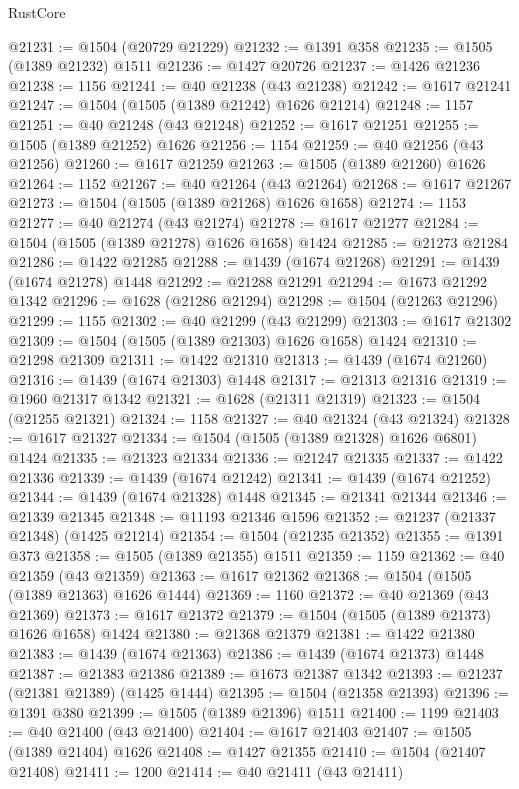 \begin{lexlean}{RustCore}
\begin{coremodule}
@21231 := @1504 (@20729 @21229)
@21232 := @1391 @358
@21235 := @1505 (@1389 @21232) @1511
@21236 := @1427 @20726
@21237 := @1426 @21236
@21238 := 1156
@21241 := @40 @21238 (@43 @21238)
@21242 := @1617 @21241
@21247 := @1504 (@1505 (@1389 @21242) @1626 @21214)
@21248 := 1157
@21251 := @40 @21248 (@43 @21248)
@21252 := @1617 @21251
@21255 := @1505 (@1389 @21252) @1626
@21256 := 1154
@21259 := @40 @21256 (@43 @21256)
@21260 := @1617 @21259
@21263 := @1505 (@1389 @21260) @1626
@21264 := 1152
@21267 := @40 @21264 (@43 @21264)
@21268 := @1617 @21267
@21273 := @1504 (@1505 (@1389 @21268) @1626 @1658)
@21274 := 1153
@21277 := @40 @21274 (@43 @21274)
@21278 := @1617 @21277
@21284 := @1504 (@1505 (@1389 @21278) @1626 @1658) @1424
@21285 := @21273 @21284
@21286 := @1422 @21285
@21288 := @1439 (@1674 @21268)
@21291 := @1439 (@1674 @21278) @1448
@21292 := @21288 @21291
@21294 := @1673 @21292 @1342
@21296 := @1628 (@21286 @21294)
@21298 := @1504 (@21263 @21296)
@21299 := 1155
@21302 := @40 @21299 (@43 @21299)
@21303 := @1617 @21302
@21309 := @1504 (@1505 (@1389 @21303) @1626 @1658) @1424
@21310 := @21298 @21309
@21311 := @1422 @21310
@21313 := @1439 (@1674 @21260)
@21316 := @1439 (@1674 @21303) @1448
@21317 := @21313 @21316
@21319 := @1960 @21317 @1342
@21321 := @1628 (@21311 @21319)
@21323 := @1504 (@21255 @21321)
@21324 := 1158
@21327 := @40 @21324 (@43 @21324)
@21328 := @1617 @21327
@21334 := @1504 (@1505 (@1389 @21328) @1626 @6801) @1424
@21335 := @21323 @21334
@21336 := @21247 @21335
@21337 := @1422 @21336
@21339 := @1439 (@1674 @21242)
@21341 := @1439 (@1674 @21252)
@21344 := @1439 (@1674 @21328) @1448
@21345 := @21341 @21344
@21346 := @21339 @21345
@21348 := @11193 @21346 @1596
@21352 := @21237 (@21337 @21348) (@1425 @21214)
@21354 := @1504 (@21235 @21352)
@21355 := @1391 @373
@21358 := @1505 (@1389 @21355) @1511
@21359 := 1159
@21362 := @40 @21359 (@43 @21359)
@21363 := @1617 @21362
@21368 := @1504 (@1505 (@1389 @21363) @1626 @1444)
@21369 := 1160
@21372 := @40 @21369 (@43 @21369)
@21373 := @1617 @21372
@21379 := @1504 (@1505 (@1389 @21373) @1626 @1658) @1424
@21380 := @21368 @21379
@21381 := @1422 @21380
@21383 := @1439 (@1674 @21363)
@21386 := @1439 (@1674 @21373) @1448
@21387 := @21383 @21386
@21389 := @1673 @21387 @1342
@21393 := @21237 (@21381 @21389) (@1425 @1444)
@21395 := @1504 (@21358 @21393)
@21396 := @1391 @380
@21399 := @1505 (@1389 @21396) @1511
@21400 := 1199
@21403 := @40 @21400 (@43 @21400)
@21404 := @1617 @21403
@21407 := @1505 (@1389 @21404) @1626
@21408 := @1427 @21355
@21410 := @1504 (@21407 @21408)
@21411 := 1200
@21414 := @40 @21411 (@43 @21411)

\end{coremodule}
\end{lexlean}
